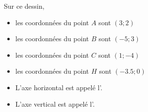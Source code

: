 \begin{example}
    \begin{center}
        
    \end{center}
    Sur ce dessin,
    \begin{itemize}
        \item les coordonnées du point \( A\) sont \(  (3;2)  \)
        \item les coordonnées du point \( B\) sont \(  (-5;3)  \)
        \item les coordonnées du point \( C\) sont \(  (1;-4)  \)
        \item les coordonnées du point \( H\) sont \(  (-3.5;0)  \)
    \end{itemize}
\end{example}

\begin{definition}
    \begin{itemize}
        \item 
            L'axe horizontal est appelé l'.
        \item
            L'axe vertical est appelé l'.
    \end{itemize}
\end{definition}


